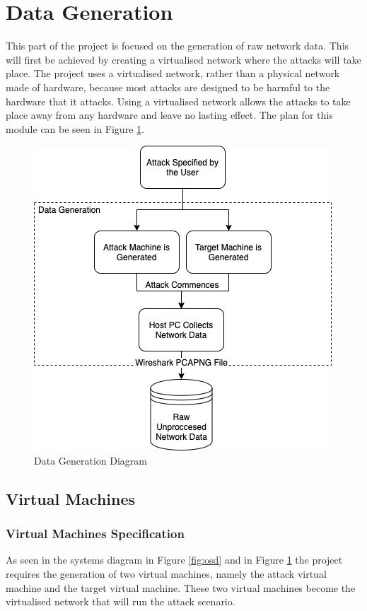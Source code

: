 \section{Data Generation}\label{sec:datagen}
This part of the project is focused on the generation of raw network data. This will first be achieved by creating a virtualised network where the attacks will take place. The project uses a virtualised network, rather than a physical network made of hardware, because most attacks are designed to be harmful to the hardware that it attacks. Using a virtualised network allows the attacks to take place away from any hardware and leave no lasting effect. The plan for this module can be seen in Figure \ref{fig:dgd}.
\begin{figure}[H]
 \centering
 \includegraphics[scale = 0.5]{Images/datagen.png}
 \caption{Data Generation Diagram}
 \label{fig:dgd}
\end{figure}

\subsection{Virtual Machines}
\subsubsection{Virtual Machines Specification}

As seen in the systems diagram in Figure \ref{fig:osd} and in Figure \ref{fig:dgd} the project requires the generation of two virtual machines, namely the attack virtual machine and the target virtual machine. These two virtual machines become the virtualised network that will run the attack scenario.


